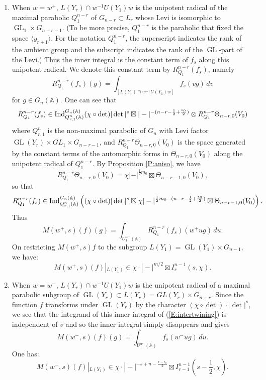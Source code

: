 \documentclass[10pt]{amsart}
\theoremstyle{plain}
\numberwithin{equation}{section}
\begin{document}
\begin{enumerate}[$\bullet$]
\item When $w = w^+$, $L(Y_r)\cap w^{-1} U(Y_1) w$ is the unipotent
  radical of the maximal parabolic $Q^{n-r}_1$ of $G_{n-r} \subset
  L_r$ whose Levi is isomorphic to ${\operatorname{GL}}_1\times G_{n-r-1}$. (To be
  more precise, $Q^{n-r}_1$ is the parabolic that fixed the space
  $\langle y_{r+1}\rangle$. For the notation $Q^{n-r}_1$, the superscript
  indicates the rank of the ambient group and the subscript indicates
  the rank of the ${\operatorname{GL}}$-part of the Levi.)
Thus the inner integral is the constant term of $f_s$ along this
unipotent radical.  We denote this constant term by $R^{n-r}_{Q_1}(f_s)$,
namely
\begin{equation}\label{E:constant_R}
R^{n-r}_{Q_1}(f_s)(g)=\int_{[L(Y_r) \cap w^{-1} U(Y_1)  w]} f_s(vg)\,dv
\end{equation}
for $g\in G_n({\mathbb{A}})$. One can see that
\[  R^{n-r}_{Q_1}(f_s) \in {\rm Ind}^{G_n({\mathbb{A}})}_{Q^n_{r,1}({\mathbb{A}})}  
(\chi \circ \det)|\det|^s \boxtimes |-|^{- (n-r - \frac{1}{2} +
  \frac{\epsilon_0}{2})} \otimes R^{n-r}_{Q_1}\Theta_{n-r,0}(V_0) \]
 where $Q^n_{r,1}$ is the non-maximal parabolic of $G_n$ with Levi
 factor ${\operatorname{GL}}(Y_r) \times GL_1 \times G_{n-r-1}$, and
 $R^{n-r}_{Q_1}\Theta_{n-r,0}(V_0)$ is the space generated by the
 constant terms of the automorphic forms in $\Theta_{n-r,0}(V_0)$
 along the unipotent radical of $Q^{n-r}_1$.  
 By Proposition \ref{P:aniso}, we have
 \[  R_{Q_1}^{n-r} \Theta_{n-r,0}(V_0) = \chi |-|^{\frac{1}{2} m_0}
 \boxtimes \Theta_{n-r-1,0}(V_0), \]
 so that
 \[   R^{n-r}_{Q_1}(f_s) \in {\rm Ind}^{G_n({\mathbb{A}})}_{Q^n_{r,1}({\mathbb{A}})} \left(
   (\chi \circ \det) |\det|^s \boxtimes
  \chi |-|^{\frac{1}{2} m_0 - (n-r - \frac{1}{2} +
    \frac{\epsilon_0}{2})} \boxtimes \Theta_{n-r-1,0}(V_0)\right). \]
Thus
 \[  M(w^+,s)(f)(g) = \int_{U_1^{w^+}({\mathbb{A}})} R^{n-r}_{Q_1}(f_s) (w^+ u
 g) \, du. \]
 On restricting $M(w^+,s)f$ to the subgroup $L(Y_1) = {\operatorname{GL}}(Y_1) \times
 G_{n-1}$, we have:
 \[  M(w^+,s)(f)|_{L(Y_1)} \in \chi \cdot  | - |^{m/2} \boxtimes I^{n-1}_r(s,\chi).
 \]
 \vskip 10pt

\item When $w = w^-$,  $L(Y_r) \cap w^{-1} U(Y_1) w$ is the unipotent
  radical of a maximal parabolic subgroup of ${\operatorname{GL}}(Y_r) \subset
  L(Y_r)=GL(Y_r)\times G_{n-r}$. Since the function $f$ transforms
  under ${\operatorname{GL}}(Y_r)$ by the  character $(\chi \circ \det)\cdot
  |\det|^s$, we see that the integrand of  this inner integral of
  (\ref{E:intertwining}) is independent of $v$ and so the inner
  integral simply disappears and gives
\[  M(w^-, s)(f)(g) = \int_{U_1^{w^-}({\mathbb{A}})} f_s(w^- u g) \, du. \]
One has:
\[  M(w^-, s)(f)|_{L(Y_1)} \in \chi \cdot |- |^{ -s+ n - \frac{r-
    \epsilon_0}{2}}  \boxtimes  I^{n-1}_{r-1}(s-\frac{1}{2},\chi).\]
\end{enumerate}
\end{document}
